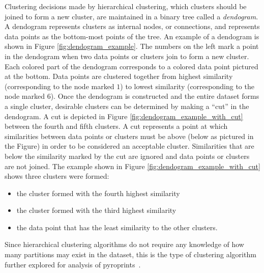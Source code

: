 \documentclass[12pt]{ucthesis}
\begin{document}
      Clustering decisions made by hierarchical clustering, which clusters
      should be joined to form a new cluster, are maintained in a binary tree
      called a \textit{dendogram}. A dendogram represents clusters as internal
      nodes, or connections, and represents data points as the bottom-most
      points of the tree. An example of a dendogram is shown in Figure
      \ref{fig:dendogram_example}. The numbers on the left mark a point in the
      dendogram when two data points or clusters join to form a new cluster.
      Each colored part of the dendogram corresponds to a colored data point
      pictured at the bottom. Data points are clustered together from highest
      similarity (corresponding to the node marked $1$) to lowest similarity
      (corresponding to the node marked $6$). Once the dendogram is constructed
      and the entire dataset forms a single cluster, desirable clusters can be
      determined by making a ``cut'' in the dendogram. A cut is depicted in
      Figure \ref{fig:dendogram_example_with_cut} between the fourth and fifth
      clusters. A cut represents a point at which similarities between data
      points or clusters must be above (below as pictured in the Figure) in
      order to be considered an acceptable cluster. Similarities that are below
      the similarity marked by the cut are ignored and data points or clusters
      are not joined. The example shown in Figure
      \ref{fig:dendogram_example_with_cut} shows three clusters were formed:
      \begin{itemize}
         \item the cluster formed with the fourth highest similarity
         \item the cluster formed with the third highest similarity
         \item the data point that has the least similarity to the other
               clusters.
      \end{itemize}
      Since hierarchical clustering algorithms do not require any knowledge of
      how many partitions may exist in the dataset, this is the type of
      clustering algorithm further explored for analysis of
      pyroprints~\cite{Jain:DataClustering}.
\end{document}
